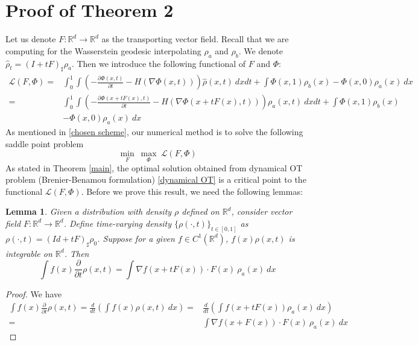 \documentclass{article}
\newtheorem{lemma}{Lemma}
\begin{document}
\section{Proof of Theorem 2}\label{study}
Let us denote $ {F}:\mathbb{R}^d\rightarrow \mathbb{R}^d$ as the transporting vector field. Recall that we are computing for the Wasserstein geodesic interpolating $\rho_a$ and $\rho_b$. We denote $\hat{\rho}_t = (I+t {F})_{\sharp}\rho_a$. Then we introduce the following functional of $F$ and $\Phi$:
\begin{align}
  \mathcal{L}( {F}, \Phi) = & \int_0^1 \int \left(-\frac{\partial \Phi(x,t)}{\partial t}-H(\nabla\Phi(x,t))\right)\hat{\rho}(x,t)~dxdt + \int \Phi(x,1)\rho_b(x) - \Phi(x, 0)\rho_a(x)~dx  \label{def of L} \nonumber \\
  = & \int_0^1 \int \left(-\frac{\partial \Phi(x+tF(x),t)}{\partial t}-H(\nabla\Phi(x+tF(x),t))\right)\rho_a(x,t)~dxdt + \int \Phi(x,1)\rho_b(x) \nonumber\\
  &- \Phi(x, 0)\rho_a(x)~dx 
\end{align}
As mentioned in \eqref{chosen scheme}, our numerical method is to solve the following saddle point problem
\begin{equation}
   \min_{ {F}}~\max_{\Phi} ~ \mathcal{L}( {F}, \Phi)  \label{saddle scheme}
\end{equation}
As stated in Theorem \ref{main}, the optimal solution obtained from dynamical OT problem (Brenier-Benamou formulation) \eqref{dynamical OT} is a critical point to the functional $\mathcal{L}( {F}, \Phi)$. Before we prove this result, we need the following lemmas:

\begin{lemma}\label{con eq}
  Given a distribution with density $\rho$ defined on $\mathbb{R}^d$, consider vector field $ {F}:\mathbb{R}^d\rightarrow\mathbb{R}^d$. Define time-varying density $\{\rho(\cdot,t)\}_{t\in [0,1]}$ as $\rho(\cdot, t) = (Id+t {F})_{\sharp}\rho_0$. Suppose for a given $f\in C^1(\mathbb{R}^d)$, $f(x)\rho(x,t)$ is integrable on $\mathbb{R}^d$. Then
  \begin{equation*}
     \int f(x)\frac{\partial}{\partial t}\rho(x,t) = \int \nabla f(x+t {F}(x))\cdot {F}(x)~\rho_a(x)~dx
  \end{equation*}
\end{lemma}
\begin{proof}
  We have
  \begin{align*}
     \int f(x)\frac{\partial}{\partial t}\rho(x,t) =\frac{d}{dt}\left(\int f(x)\rho(x,t)~dx\right)= &\frac{d}{dt}\left(\int f(x+t {F}(x))\rho_a(x)~dx\right)\\=& \int \nabla f(x+ {F}(x))\cdot {F}(x)~\rho_a(x)~dx
  \end{align*}
\end{proof}
\end{document}
